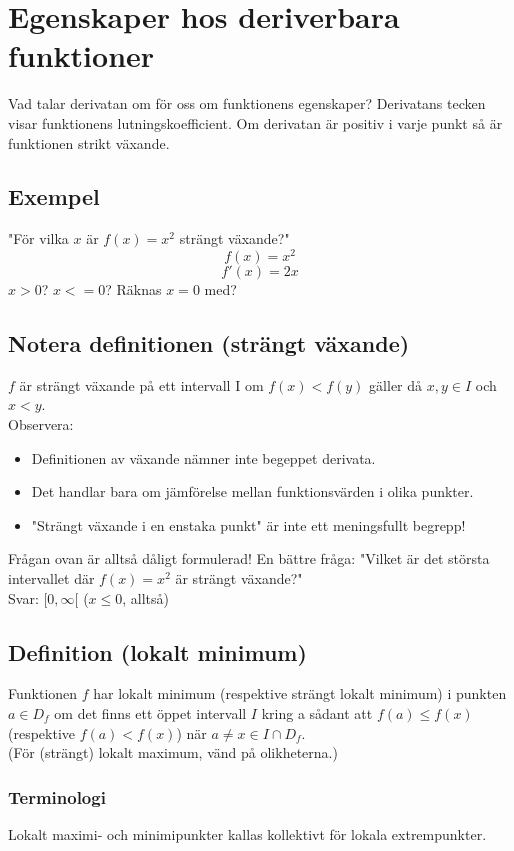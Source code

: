 \documentclass{article}
\begin{document}
\section{Egenskaper hos deriverbara funktioner}
Vad talar derivatan om för oss om funktionens egenskaper? Derivatans tecken visar
funktionens lutningskoefficient. Om derivatan är positiv i varje punkt så är funktionen
strikt växande.

\subsection{Exempel}
"För vilka $x$ är $f(x)=x^2$ strängt växande?"
$$f(x)=x^2$$
$$f'(x)=2x$$
$x>0$?
$x<=0$?
Räknas $x=0$ med?

\subsection{Notera definitionen (strängt växande)}
$f$ är strängt växande på ett intervall I om $f(x)<f(y)$ gäller då $x,y\in I$ och $x<y$.\\

Observera:
\begin{itemize}
  \item Definitionen av växande nämner inte begeppet derivata.
  \item Det handlar bara om jämförelse mellan funktionsvärden i olika punkter.
  \item "Strängt växande i en enstaka punkt" är inte ett meningsfullt begrepp!
\end{itemize}

Frågan ovan är alltså dåligt formulerad!
En bättre fråga: "Vilket är det största intervallet där $f(x)=x^2$ är strängt växande?"\\
Svar: $[0,\infty[$ ($x\le 0$, alltså)

\subsection{Definition (lokalt minimum)}
Funktionen $f$ har lokalt minimum (respektive strängt lokalt minimum) i punkten $a\in D_f$ om det
finns ett öppet intervall $I$ kring a sådant att $f(a)\le f(x)$ (respektive $f(a)<f(x)$) när
$a\neq x \in I \cap D_f$.\\
(För (strängt) lokalt maximum, vänd på olikheterna.)\\

\subsubsection{Terminologi}
Lokalt maximi- och minimipunkter kallas kollektivt för lokala extrempunkter.
\end{document}
